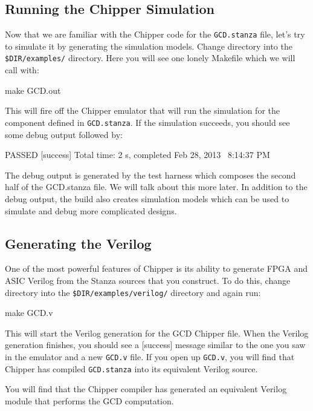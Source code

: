 \subsection{Running the Chipper Simulation}

Now that we are familiar with the Chipper code for the \verb+GCD.stanza+ file, let's try to simulate it by generating the simulation models. Change directory into the \verb+$DIR/examples/+ directory. Here you will see one lonely Makefile which we will call with:

\begin{bash}
make GCD.out
\end{bash}

\noindent
This will fire off the Chipper emulator that will run the simulation for the component defined in \verb+GCD.stanza+. If the simulation succeeds, you should see some debug output followed by:
\begin{footnotesize}
\begin{bash}
PASSED
[success] Total time: 2 s, completed Feb 28, 2013 \
  8:14:37 PM
\end{bash}
\end{footnotesize}

The debug output is generated by the test harness which composes the second half of the GCD.stanza file. We will talk about this more later. In addition to the debug output, the build also creates simulation models which can be used to simulate and debug more complicated designs.

\subsection{Generating the Verilog}

One of the most powerful features of Chipper is its ability to generate FPGA and ASIC Verilog from the Stanza sources that you construct. To do this, change directory into the \verb+$DIR/examples/verilog/+ directory and again run:
\begin{bash}
make GCD.v
\end{bash}
This will start the Verilog generation for the GCD Chipper file. When the Verilog generation finishes, you should see a [success] message similar to the one you saw in the emulator and a new \verb+GCD.v+ file. If you open up \verb+GCD.v+, you will find that Chipper has compiled \verb+GCD.stanza+ into its equivalent Verilog source.

You will find that the Chipper compiler has generated an equivalent Verilog module that performs the GCD computation.


